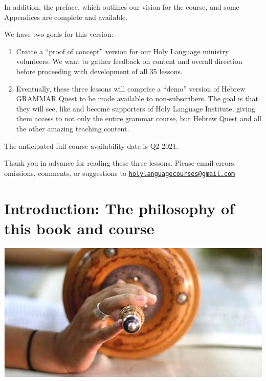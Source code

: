 \documentclass[
]{turabian-researchpaper}
\providecommand{\tightlist}{%
  \setlength{\itemsep}{0pt}\setlength{\parskip}{0pt}}
\begin{document}
In addition, the preface, which outlines our vision for the course, and some Appendices are complete and available.

We have two goals for this version:

\begin{enumerate}
\def\labelenumi{\arabic{enumi}.}
\tightlist
\item
  Create a ``proof of concept'' version for our Holy Language ministry volunteers. We want to gather feedback on content and overall direction before proceeding with development of all 35 lessons.
\item
  Eventually, these three lessons will comprise a ``demo'' version of Hebrew GRAMMAR Quest to be made available to non-subscribers. The goal is that they will see, like and become supporters of Holy Language Institute, giving them access to not only the entire grammar course, but Hebrew Quest and all the other amazing teaching content.
\end{enumerate}

The anticipated full course availability date is Q2 2021.

Thank you in advance for reading these three lessons. Please email errors, omissions, comments, or suggestions to \href{mailto:holylanguagecourses@gmail.com}{\nolinkurl{holylanguagecourses@gmail.com}}

\hypertarget{preface}{%
\section*{Introduction: The philosophy of this book and course}\label{preface}}

\begin{center}\includegraphics[width=500pt]{images/torah_scroll} \end{center}
\end{document}
